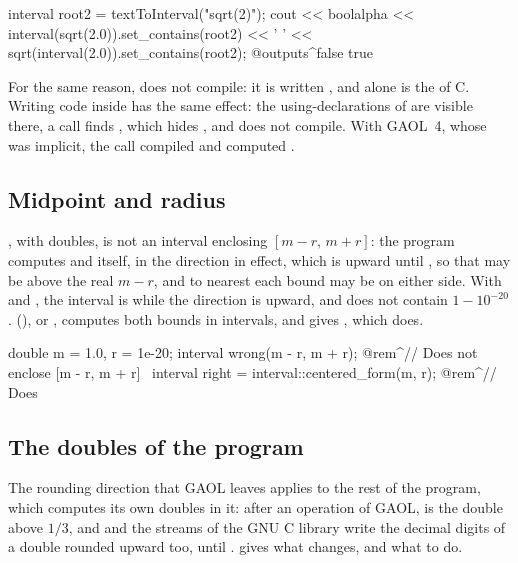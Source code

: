 \begin{example}
interval root2 = textToInterval("sqrt(2)");
cout << boolalpha << interval(sqrt(2.0)).set_contains(root2) << ' '
     << sqrt(interval(2.0)).set_contains(root2);
@outputs^false true~
\end{example}

\noindent
For the same reason,  does not compile: it is written
, and  alone is the 
of C. Writing code inside  has the same effect: the
using-declarations of  are visible there, a call 
finds , which hides , and does not compile. With
GAOL~4, whose  was implicit, the call compiled and
computed .

\subsection{Midpoint and radius}
%

, with doubles, is not an interval enclosing
$[m-r,\,m+r]$: the program computes  and  itself, in
the direction in effect, which is upward until , so that
 may be above the real $m-r$, and to nearest each bound may be on
either side. With  and , the interval is
 while the direction is upward, and does not contain
$1-10^{-20}$.  (),
or , computes both bounds in intervals, and gives
, which does.\newinvfive

\begin{example}
double m = 1.0, r = 1e-20;
interval wrong(m - r, m + r);  @rem^// Does not enclose [m - r, m + r]~
interval right = interval::centered_form(m, r);  @rem^// Does~
\end{example}

\subsection{The doubles of the program}

The rounding direction that GAOL leaves applies to the rest of the program,
which computes its own doubles in it: after an operation of GAOL,
 is the double above $1/3$, and  and the
streams of the GNU C library write the decimal digits of a double rounded
upward too, until .  gives what
changes, and what to do.\newinvfive

